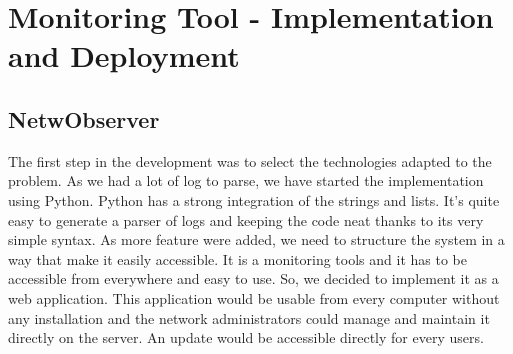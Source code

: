 \chapter{Monitoring Tool - Implementation and Deployment} %

\label{Chapter4} %


\section{NetwObserver}
The first step in the development was to select the technologies adapted to the problem. As we had a lot of log to parse, we have started the implementation using Python. Python has a strong integration of the strings and lists. It's quite easy to generate a parser of logs and keeping the code neat thanks to its very simple syntax.
As more feature were added, we need to structure the system in a way that make it easily accessible. It is a monitoring tools and it has to be accessible from everywhere and easy to use. So, we decided to implement it as a web application. This application would be usable from every computer without any installation and the network administrators could manage and maintain it directly on the server. An update would be accessible directly for every users.

